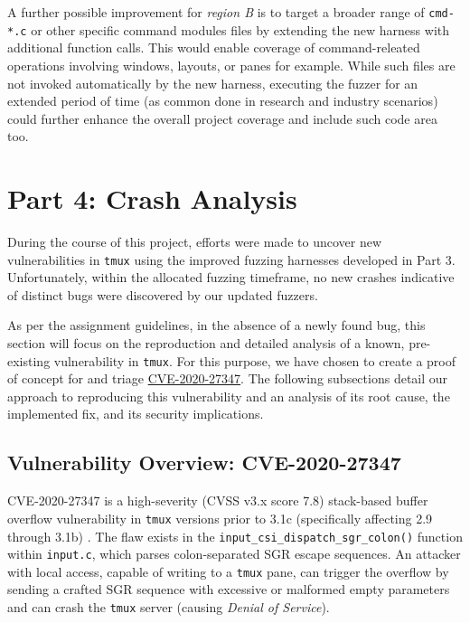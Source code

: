 \documentclass[11pt,a4paper,twocolumn]{article}
\begin{document}
A further possible improvement for \textit{region B} is to target a broader range of \texttt{cmd-*.c} or other specific command modules files by extending the new harness with additional function calls. This would enable coverage of command-releated operations involving windows, layouts, or panes for example. While such files are not invoked automatically by the new harness, executing the fuzzer for an extended period of time (as common done in research and industry scenarios) could further enhance the overall project coverage and include such code area too.

\section*{Part 4: Crash Analysis}

During the course of this project, efforts were made to uncover new vulnerabilities in \texttt{tmux} using the improved fuzzing harnesses developed in Part 3. Unfortunately, within the allocated fuzzing timeframe, no new crashes indicative of distinct bugs were discovered by our updated fuzzers.

As per the assignment guidelines, in the absence of a newly found bug, this section will focus on the reproduction and detailed analysis of a known, pre-existing vulnerability in \texttt{tmux}. For this purpose, we have chosen to create a proof of concept for and triage \href{https://www.cve.org/CVERecord?id=CVE-2020-27347}{CVE-2020-27347}. The following subsections detail our approach to reproducing this vulnerability and an analysis of its root cause, the implemented fix, and its security implications.

\subsection*{Vulnerability Overview: CVE-2020-27347}

CVE-2020-27347 is a high-severity (CVSS v3.x score 7.8) stack-based buffer overflow vulnerability in {\texttt{tmux}} versions prior to 3.1c (specifically affecting 2.9 through 3.1b) \cite{CVE-2020-27347}. The flaw exists in the \texttt{input\_csi\_dispatch\_sgr\_colon()} function within \texttt{input.c}, which parses colon-separated SGR escape sequences. An attacker with local access, capable of writing to a {\texttt{tmux}} pane, can trigger the overflow by sending a crafted SGR sequence with excessive or malformed empty parameters and can crash the \texttt{tmux} server (causing \textit{Denial of Service}).
\end{document}

